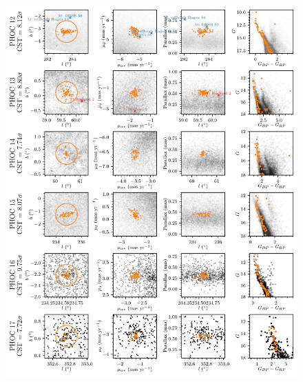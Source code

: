 \begin{figure}[ht]
   \centering
   \includegraphics[width=\textwidth]{fig/c2/fig_new_ocs_2.pdf}
   \caption[Plots of the new OCs PHOC 12 to 17]{}%
   \label{app:c2:fig:new_ocs_2}
\end{figure}

